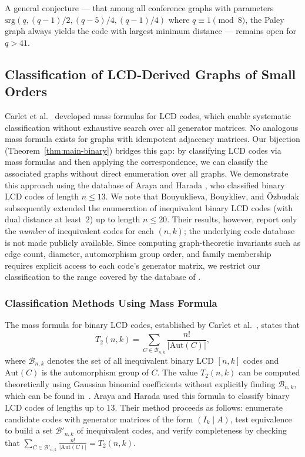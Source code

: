 \documentclass[a4paper,11pt]{article}
\theoremstyle{remark}
\begin{document}
A general conjecture --- that among all conference graphs with parameters $\text{srg}(q,(q-1)/2,(q-5)/4,(q-1)/4)$ where $q \equiv 1 \pmod 8$, the Paley graph always yields the code with largest minimum distance --- remains open for $q > 41$.

\subsection{Classification of LCD-Derived Graphs of Small Orders}\label{sec:computational}

Carlet et al.~\cite{carlet2019} developed mass formulas for LCD codes, which enable systematic classification without exhaustive search over all generator matrices. No analogous mass formula exists for graphs with idempotent adjacency matrices. Our bijection (Theorem~\ref{thm:main-binary}) bridges this gap: by classifying LCD codes via mass formulas and then applying the correspondence, we can classify the associated graphs without direct enumeration over all graphs.
We demonstrate this approach using the database of Araya and Harada \cite{araya2019}, who classified binary LCD codes of length $n \leq 13$.
We note that Bouyuklieva, Bouykliev, and \"Ozbudak \cite{bouyuklieva2026} subsequently extended the enumeration of inequivalent binary LCD codes (with dual distance at least~$2$) up to length $n \leq 20$. Their results, however, report only the \emph{number} of inequivalent codes for each $(n,k)$; the underlying code database is not made publicly available. Since computing graph-theoretic invariants such as edge count, diameter, automorphism group order, and family membership requires explicit access to each code's generator matrix, we restrict our classification to the range covered by the database of \cite{araya2019}.

\subsubsection{Classification Methods Using Mass Formula}

The mass formula for binary LCD codes, established by Carlet et al.~\cite{carlet2019}, states that
\[
T_2(n,k) = \sum_{C \in \mathcal{B}_{n,k}} \frac{n!}{|\mathrm{Aut}(C)|},
\]
where $\mathcal{B}_{n,k}$ denotes the set of all inequivalent binary LCD $[n,k]$ codes and $\mathrm{Aut}(C)$ is the automorphism group of $C$. The value $T_2(n,k)$ can be computed theoretically using Gaussian binomial coefficients without explicitly finding $\mathcal{B}_{n,k}$, which can be found in~\cite{carlet2019}.
Araya and Harada \cite{araya2019} used this formula to classify binary LCD codes of lengths up to $13$. Their method proceeds as follows: enumerate candidate codes with generator matrices of the form $(I_k \mid A)$, test equivalence to build a set $\mathcal{B}'_{n,k}$ of inequivalent codes, and verify completeness by checking that $\sum_{C \in \mathcal{B}'_{n,k}} \frac{n!}{|\mathrm{Aut}(C)|} = T_2(n,k)$.
\end{document}
